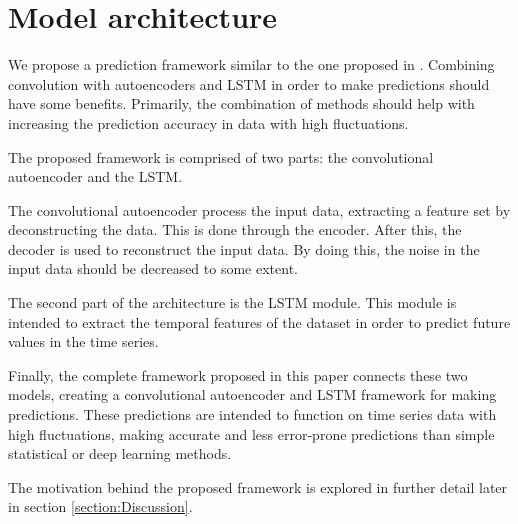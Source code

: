 \section{Model architecture}
\label{section:Architecture:Model}


We propose a prediction framework similar to the one proposed in \cite{Zhao2019}.
Combining convolution with autoencoders and LSTM in order to make predictions should have some benefits.
Primarily, the combination of methods should help with increasing the prediction accuracy in data with high fluctuations.

The proposed framework is comprised of two parts: the convolutional autoencoder and the LSTM.


The convolutional autoencoder process the input data, extracting a feature set by deconstructing the data.
This is done through the encoder. After this, the decoder is used to reconstruct the input data.
By doing this, the noise in the input data should be decreased to some extent.

The second part of the architecture is the LSTM module.
This module is intended to extract the temporal features of the dataset
in order to predict future values in the time series.


Finally, the complete framework proposed in this paper connects these two models,
creating a convolutional autoencoder and LSTM framework for making predictions.
These predictions are intended to function on time series data with high fluctuations,
making accurate and less error-prone predictions than simple statistical or deep learning methods.

The motivation behind the proposed framework is explored in further detail later in section \ref{section:Discussion}.

